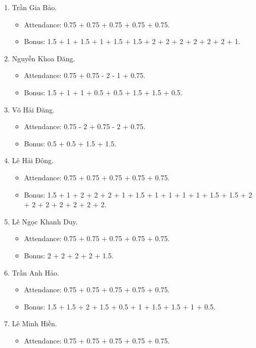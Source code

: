 \documentclass{article}
\begin{document}
\begin{enumerate}
    \item {\sc Trần Gia Bảo.}
    \begin{itemize}
        \item Attendance: 0.75 + 0.75 + 0.75 + 0.75 + 0.75.
        \item Bonus: 1.5 + 1 + 1.5 + 1 + 1.5 + 1.5 + 2 + 2 + 2 + 2 + 2 + 2 + 1.
    \end{itemize}
    \item {\sc Nguyễn Khoa Đăng.}
    \begin{itemize}
        \item Attendance: 0.75 + 0.75 - 2 - 1 + 0.75.
        \item Bonus: 1.5 + 1 + 1 + 0.5 + 0.5 + 1.5 + 1.5 + 0.5.
    \end{itemize}
    \item {\sc Võ Hải Đăng.}
    \begin{itemize}
        \item Attendance: 0.75 - 2 + 0.75 - 2 + 0.75.
        \item Bonus: 0.5 + 0.5 + 1.5 + 1.5.
    \end{itemize}
    \item {\sc Lê Hải Đông.}
    \begin{itemize}
        \item Attendance: 0.75 + 0.75 + 0.75 + 0.75 + 0.75.
        \item Bonus: 1.5 + 1 + 2 + 2 + 2 + 1 + 1.5 + 1 + 1 + 1 + 1 + 1.5 + 1.5 + 2 + 2 + 2 + 2 + 2 + 2 + 2.
    \end{itemize}
    \item {\sc Lê Ngọc Khanh Duy.}
    \begin{itemize}
        \item Attendance: 0.75 + 0.75 + 0.75 + 0.75 + 0.75.
        \item Bonus: 2 + 2 + 2 + 2 + 1.5.
    \end{itemize}
    \item {\sc Trần Anh Hảo.}
    \begin{itemize}
        \item Attendance: 0.75 + 0.75 + 0.75 + 0.75 + 0.75.
        \item Bonus: 1.5 + 1.5 + 2 + 1.5 + 0.5 + 1 + 1.5 + 1.5 + 1 + 0.5.
    \end{itemize}
    \item {\sc Lê Minh Hiền.}
    \begin{itemize}
        \item Attendance: 0.75 + 0.75 + 0.75 + 0.75 + 0.75.

\end{itemize}
\end{enumerate}
\end{document}
